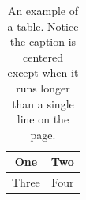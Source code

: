 \begin{table}[tbh]
\renewcommand{\arraystretch}{1.3}
\centering
\begin{tabular}{|c||c|}
\hline
One & Two\\
\hline
Three & Four\\
\hline
\end{tabular}
\caption[Example table]{An example of a table. Notice the caption is centered except when it runs longer than a single line on the page.}
\label{tab.example_1}
\end{table}